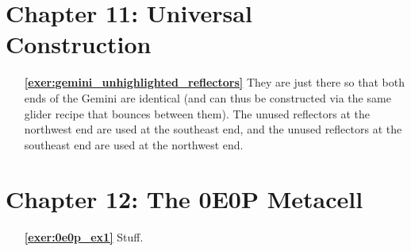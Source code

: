 \hypertarget{solutions_universal_construction}{}\label{solutions_universal_construction}
\section*{Chapter 11: Universal Construction}
\renewcommand{\chapterfolder}{universal_construction/}

\begin{multicols}{2}
	\begin{itemize}[leftmargin=0em]
		\item[\bf\color{ocre}\sffamily\ref{exer:gemini_unhighlighted_reflectors}] They are just there so that both ends of the Gemini are identical (and can thus be constructed via the same glider recipe that bounces between them). The unused reflectors at the northwest end are used at the southeast end, and the unused reflectors at the southeast end are used at the northwest end.
	\end{itemize}
\end{multicols}



\hypertarget{solutions_0e0p}{}\label{solutions_0e0p}
\section*{Chapter 12: The 0E0P Metacell}
\renewcommand{\chapterfolder}{0e0p/}

\begin{multicols}{2}
	\begin{itemize}[leftmargin=0em]
		\item[\bf\color{ocre}\sffamily\ref{exer:0e0p_ex1}] Stuff.
	\end{itemize}
\end{multicols}

\normalsize